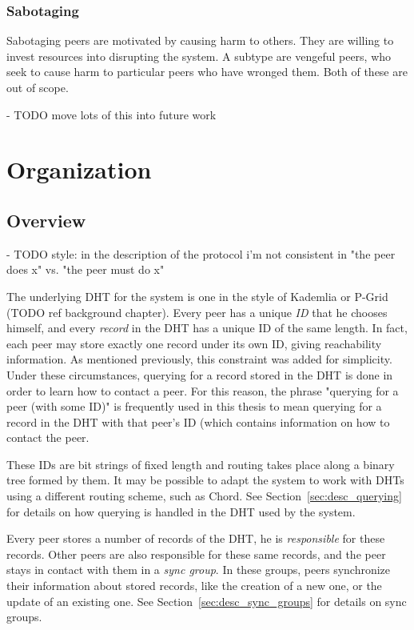 \subsubsection{Sabotaging}
Sabotaging peers are motivated by causing harm to others. They are willing to
invest resources into disrupting the system. A subtype are vengeful peers, who
seek to cause harm to particular peers who have wronged them. Both of these are
out of scope.

- TODO move lots of this into future work

\section{Organization}
\subsection{Overview}
- TODO style: in the description of the protocol i'm not consistent in "the peer
  does x" vs. "the peer must do x"

The underlying \ac{DHT} for the system is one in the style of Kademlia or P-Grid
(TODO ref background chapter). Every peer has a unique \emph{ID} that he chooses
himself, and every \emph{record} in the \ac{DHT} has a unique ID of the same
length. In fact, each peer may store exactly one record under its own ID, giving
reachability information. As mentioned previously, this constraint was added for
simplicity. Under these circumstances, querying for a record stored in the
\ac{DHT} is done in order to learn how to contact a peer. For this reason, the
phrase "querying for a peer (with some ID)" is frequently used in this thesis to
mean querying for a record in the \ac{DHT} with that peer's ID (which contains
information on how to contact the peer.

These IDs are bit strings of fixed length and routing takes place
along a binary tree formed by them. It may be possible to adapt the system to
work with \acp{DHT} using a different routing scheme, such as Chord. See
Section~\ref{sec:desc_querying} for details on how querying is handled in the
\ac{DHT} used by the system.

Every peer stores a number of records of the \ac{DHT}, he is \emph{responsible}
for these records. Other peers are also responsible for these same records, and
the peer stays in contact with them in a \emph{sync group}. In these groups,
peers synchronize their information about stored records, like the creation of a
new one, or the update of an existing one. See
Section~\ref{sec:desc_sync_groups} for details on sync groups.

